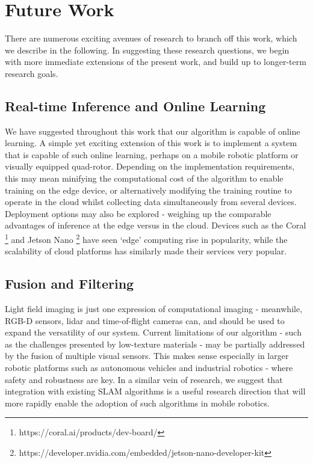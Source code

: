 \section{Future Work}

There are numerous exciting avenues of research to branch off this work, which we describe in the following. In suggesting these research questions, we begin with more immediate extensions of the present work, and build up to longer-term research goals. 

\subsection{Real-time Inference and Online Learning}
We have suggested throughout this work that our algorithm is capable of online learning. A simple yet exciting extension of this work is to implement a system that is capable of such online learning, perhaps on a mobile robotic platform or visually equipped quad-rotor. Depending on the implementation requirements, this may mean minifying the computational cost of the algorithm to enable training on the edge device, or alternatively modifying the training routine to operate in the cloud whilst collecting data simultaneously from several devices. Deployment options may also be explored - weighing up the comparable advantages of inference at the edge versus in the cloud. Devices such as the Coral \footnote{https://coral.ai/products/dev-board/} and Jetson Nano \footnote{https://developer.nvidia.com/embedded/jetson-nano-developer-kit} have seen `edge' computing rise in popularity, while the scalability of cloud platforms has similarly made their services very popular. 

\subsection{Fusion and Filtering}
Light field imaging is just one expression of computational imaging - meanwhile, RGB-D sensors, lidar and time-of-flight cameras can, and should be used to expand the versatility of our system. Current limitations of our algorithm - such as the challenges presented by low-texture materials - may be partially addressed by the fusion of multiple visual sensors. This makes sense especially in larger robotic platforms such as autonomous vehicles and industrial robotics - where safety and robustness are key. In a similar vein of research, we suggest that integration with existing SLAM algorithms is a useful research direction that will more rapidly enable the adoption of such algorithms in mobile robotics.


